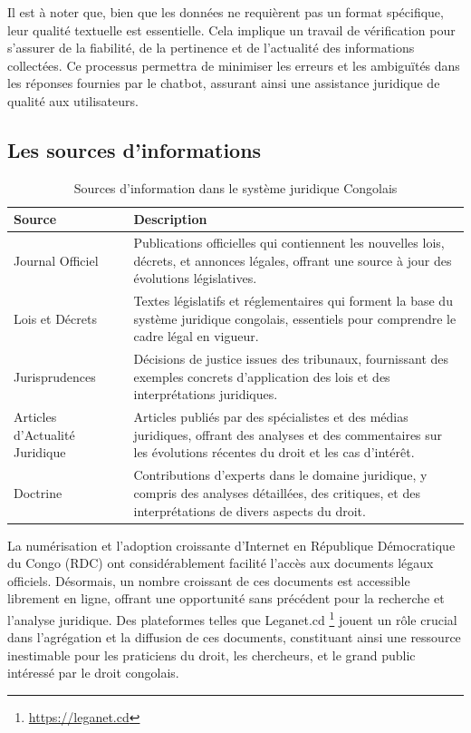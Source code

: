 Il est à noter que, bien que les données ne requièrent pas un format spécifique, leur qualité textuelle est essentielle. Cela implique un travail de vérification pour s'assurer de la fiabilité, de la pertinence et de l'actualité des informations collectées. Ce processus permettra de minimiser les erreurs et les ambiguïtés dans les réponses fournies par le chatbot, assurant ainsi une assistance juridique de qualité aux utilisateurs.

\subsection{Les sources d'informations}

\begin{table}[h]
\centering
\begin{tabular}{|l|p{10cm}|}
    \hline
    \textbf{Source} & \textbf{Description} \\
    \hline
    Journal Officiel & Publications officielles qui contiennent les nouvelles lois, décrets, et annonces légales, offrant une source à jour des évolutions législatives. \\
    \hline
    Lois et Décrets & Textes législatifs et réglementaires qui forment la base du système juridique congolais, essentiels pour comprendre le cadre légal en vigueur. \\
    \hline
    Jurisprudences & Décisions de justice issues des tribunaux, fournissant des exemples concrets d’application des lois et des interprétations juridiques. \\
    \hline
    Articles d’Actualité Juridique & Articles publiés par des spécialistes et des médias juridiques, offrant des analyses et des commentaires sur les évolutions récentes du droit et les cas d’intérêt. \\
    \hline
    Doctrine & Contributions d’experts dans le domaine juridique, y compris des analyses détaillées, des critiques, et des interprétations de divers aspects du droit. \\
    \hline
\end{tabular}
\caption{Sources d'information dans le système juridique Congolais}
\label{table:sources-legales-congo}
\end{table}

La numérisation et l'adoption croissante d'Internet en République Démocratique du Congo (RDC) ont considérablement facilité l'accès aux documents légaux officiels. Désormais, un nombre croissant de ces documents est accessible librement en ligne, offrant une opportunité sans précédent pour la recherche et l'analyse juridique. Des plateformes telles que Leganet.cd \footnote{\href{https://leganet.cd}{https://leganet.cd}} jouent un rôle crucial dans l'agrégation et la diffusion de ces documents, constituant ainsi une ressource inestimable pour les praticiens du droit, les chercheurs, et le grand public intéressé par le droit congolais.

